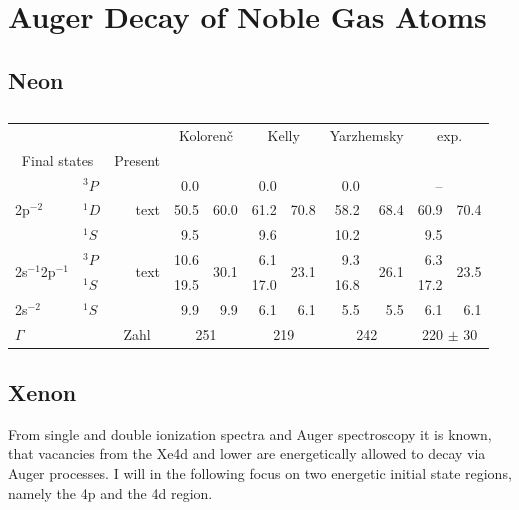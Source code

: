 \chapter{Auger Decay of Noble Gas Atoms}
\section{Neon}

\begin{table}[h]
  \centering
  \caption{}
  \begin{tabular}{llrrrrrrrrrr}
   \toprule
    & & & & \multicolumn{2}{c}{Koloren\v{c}} & \multicolumn{2}{c}{Kelly} & \multicolumn{2}{c}{Yarzhemsky} & \multicolumn{2}{c}{exp.}\\
   \multicolumn{2}{c}{Final states} & \multicolumn{2}{c}{Present} & \multicolumn{2}{c}{\cite{Kolorenc11}} & \multicolumn{2}{c}{\cite{Kelly}} & \multicolumn{2}{c}{\cite{Yarzhemsky}} & \multicolumn{2}{c}{\cite{}}\\
   \midrule
   \multirow{3}{*}{2p$^{-2}$} & $^3P$ &      & \multirow{3}{*}{text} &  0.0 & \multirow{3}{*}{60.0} &  0.0 & \multirow{3}{*}{70.8} &  0.0 & \multirow{3}{*}{68.4} &  --  & \multirow{3}{*}{70.4}\\
                              & $^1D$ &      & & 50.5 & & 61.2 & & 58.2 & & 60.9&\\
                              & $^1S$ &      & &  9.5 & &  9.6 & & 10.2 & &  9.5&\\
   \midrule
 \multirow{2}{*}{2s$^{-1}$2p$^{-1}$} & $^3P$ &      & \multirow{2}{*}{text} & 10.6 & \multirow{2}{*}{30.1} &  6.1 & \multirow{2}{*}{23.1} &  9.3 & \multirow{2}{*}{26.1} &  6.3 & \multirow{2}{*}{23.5}\\
                              & $^1S$ &      & & 19.5 & & 17.0 & & 16.8 & & 17.2&\\
   \midrule
      2s$^{-2}$               & $^1S$ &      & &  9.9 & 9.9 &  6.1 & 6.1 &  5.5 & 5.5 &  6.1& 6.1\\
   \midrule
   $\Gamma$  & & \multicolumn{2}{c}{Zahl}  & \multicolumn{2}{c}{251} & \multicolumn{2}{c}{219} & \multicolumn{2}{c}{242} & \multicolumn{2}{c}{220 $\pm$ 30}\\
   \bottomrule
  \end{tabular}
  \label{table:Ne_gammas}
\end{table}

\section{Xenon}
From single and double ionization spectra and Auger spectroscopy
it is known, that vacancies from the Xe4d and lower are energetically allowed to
decay via Auger processes. \cite{Siegbahn69}
I will in the following focus on two energetic initial state regions, namely
the 4p and the 4d region.

